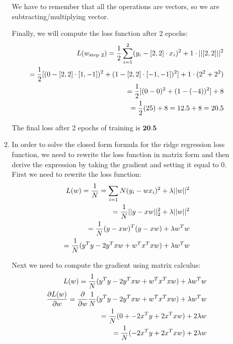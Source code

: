 \documentclass[12pt]{article}
\begin{document}
\begin{enumerate}
\begin{enumerate}
   We have to remember that all the operations are vectors, so we are subtracting/multiplying vector. 

   Finally, we will compute the loss function after 2 epochs: 
   \begin{align}
   L(w_{\text{step 2}}) = \frac{1}{2} \sum_{i=1}^{2} (y_i - [2,2] \cdot x_i)^2 + 1 \cdot ||[2,2]||^2 \notag \\
   = \frac{1}{2} [(0 - [2,2] \cdot [1,-1])^2 + (1 - [2,2] \cdot [-1,-1])^2] + 1 \cdot (2^2 + 2^2) \notag \\ 
   = \frac{1}{2} [(0-0)^2 + (1-(-4))^2] + 8 \notag \\ 
   = \frac{1}{2} (25) + 8 = 12.5 + 8 = 20.5 \notag 
   \end{align}

   The final loss after 2 epochs of training is $\textbf{20.5}$
   \item In order to solve the closed form formula for the ridge regression loss function, we need to rewrite the loss function in matrix form and then derive the expression by taking the gradient and setting it equal to $0$. \\ 

    First we need to rewrite the loss function: \\ 
    \begin{align}
      L(w) = \frac{1}{N} = \sum_{i=1}{N} (y_i - wx_i)^2 + \lambda ||w||^2 \notag \\ 
      = \frac{1}{N} ||y-xw||^2_2 + \lambda ||w||^2 \notag \\ 
      = \frac{1}{N} (y-xw)^T(y-xw) + \lambda w^Tw \notag \\
      = \frac{1}{N} (y^Ty - 2y^Txw + w^Tx^Txw) + \lambda w^Tw \notag
    \end{align}

    Next we need to compute the gradient using matrix calculus: \\ 
    \begin{align}
      L(w) = \frac{1}{N} (y^Ty - 2y^Txw + w^Tx^Txw) + \lambda w^Tw \notag \\ 
      \frac{\partial L(w)}{\partial w} = \frac{\partial}{\partial w} \frac{1}{N} (y^Ty - 2y^Txw + w^Tx^Txw) + \lambda w^Tw \notag \\
      = \frac{1}{N} (0 + -2x^Ty + 2x^Txw) + 2 \lambda w \notag \\ 
      = \frac{1}{N} (-2x^Ty + 2x^Txw) + 2 \lambda w \notag
    \end{align}


\end{enumerate}
\end{enumerate}
\end{document}
